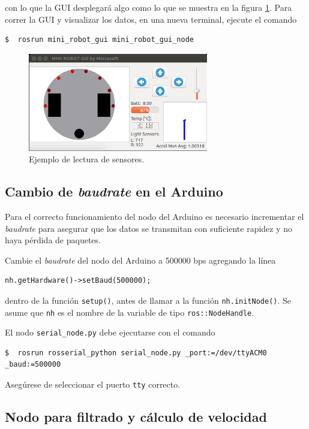 \documentclass[a4paper,12pt]{article}
\begin{document}
con lo que la GUI desplegará algo como lo que se muestra en la figura \ref{fig:Example}. Para correr la GUI y visualizar los datos, en una nueva terminal, ejecute el comando

\begin{lstlisting}[language=bash]
$  rosrun mini_robot_gui mini_robot_gui_node
\end{lstlisting}

\begin{figure}
  \centering
  \includegraphics[width=0.7\textwidth]{Figures/SensorExample.png}
  \caption{Ejemplo de lectura de sensores.}
  \label{fig:Example}
\end{figure}

\subsection{Cambio de \textit{baudrate} en el Arduino}
Para el correcto funcionamiento del nodo del Arduino es necesario incrementar el \textit{baudrate} para asegurar que los datos se transmitan con suficiente rapidez y no haya pérdida de paquetes. 

Cambie el \textit{baudrate} del nodo del Arduino a 500000 bps agregando la línea 
\begin{lstlisting}
nh.getHardware()->setBaud(500000);
\end{lstlisting}
dentro de la función \texttt{setup()}, antes de llamar a la función \texttt{nh.initNode()}. Se asume que \texttt{nh} es el nombre de la variable de tipo \texttt{ros::NodeHandle}.

El nodo \texttt{serial\_node.py} debe ejecutarse con el comando
\begin{lstlisting}
$  rosrun rosserial_python serial_node.py _port:=/dev/ttyACM0 _baud:=500000
\end{lstlisting}
Asegúrese de seleccionar el puerto \texttt{tty} correcto. 

\subsection{Nodo para filtrado y cálculo de velocidad}
\end{document}
